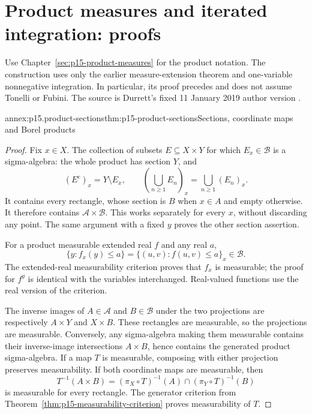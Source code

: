 \section{Product measures and iterated integration: proofs}
\label{sec:annex-p15-product-measures}

Use Chapter~\ref{sec:p15-product-measures} for the product notation.
The construction uses only the earlier measure-extension theorem and
one-variable nonnegative integration. In particular, its proof precedes
and does not assume Tonelli or Fubini. The source is Durrett's fixed
11 January 2019 author version \cite[sec.~1.7]{DurrettPTEAuthor2019}.

\begin{annexitem}{annex:p15.product-sections}{thm:p15-product-sections}{Sections, coordinate maps and Borel products}
\begin{proof}
Fix \(x\in X\). The collection of subsets \(E\subseteq X\times Y\)
for which \(E_x\in\mathcal B\) is a sigma-algebra: the whole
product has section \(Y\), and
\[
 (E^c)_x=Y\setminus E_x,\qquad
 \left(\bigcup_{n\geq1}E_n\right)_x=\bigcup_{n\geq1}(E_n)_x.
\]
It contains every rectangle, whose section is \(B\) when \(x\in A\)
and empty otherwise. It therefore contains \(\mathcal A\times\mathcal B\).
This works separately for every \(x\), without discarding any point.
The same argument with a fixed \(y\) proves the other section assertion.

For a product measurable extended real \(f\) and any real \(a\),
\[
 \{y:f_x(y)\leq a\}=\{(u,v):f(u,v)\leq a\}_x\in\mathcal B.
\]
The extended-real measurability criterion proves that \(f_x\) is
measurable; the proof for \(f^y\) is identical with the variables
interchanged. Real-valued functions use the real version of the criterion.

The inverse images of \(A\in\mathcal A\) and \(B\in\mathcal B\)
under the two projections are respectively \(A\times Y\) and
\(X\times B\). These rectangles are measurable, so the projections
are measurable. Conversely, any sigma-algebra making them measurable
contains their inverse-image intersections \(A\times B\), hence
contains the generated product sigma-algebra. If a map \(T\) is
measurable, composing with either projection preserves measurability.
If both coordinate maps are measurable, then
\[
 T^{-1}(A\times B)
   =(\pi_X\circ T)^{-1}(A)\cap(\pi_Y\circ T)^{-1}(B)
\]
is measurable for every rectangle. The generator criterion from
Theorem~\ref{thm:p15-measurability-criterion} proves measurability of \(T\).


\end{proof}
\end{annexitem}
